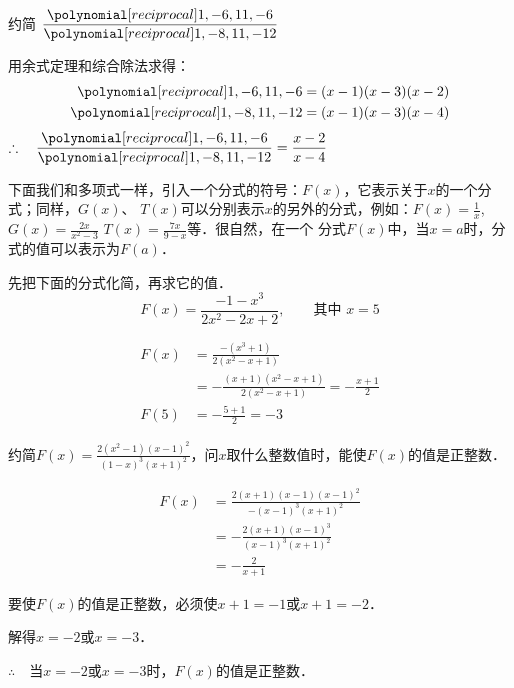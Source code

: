 \begin{example}
    约简 $\frac{\poly{1,-6,11,-6}}{\poly{1,-8,11,-12}}$  
\end{example}

\begin{solution}
用余式定理和综合除法求得：
\[\begin{split}
    \poly{1,-6,11,-6}&=(x-1)(x-3)(x-2)\\
    \poly{1,-8,11,-12}&=(x-1)(x-3)(x-4)
\end{split}\]
$\therefore\quad \frac{\poly{1,-6,11,-6}}{\poly{1,-8,11,-12}}=\frac{x-2}{x-4}$
\end{solution}

下面我们和多项式一样，引入一个分式的符号：$F(x)$，它表示关于$x$的一个分式；同样，$G(x)$、
$T(x)$可以分别表示$x$的另外的分式，例如：$F(x)=\frac{1}{x}$, $G(x)=\frac{2x}{x^2-3}$
$T (x) =\frac{7x}{9-x}$等．很自然，在一个
分式$F(x)$中，当$x=a$时，分式的值可以表示为$F (a)$．

\begin{example}
    先把下面的分式化简，再求它的值．
    \[F(x)=\frac{-1-x^3}{2x^2-2x+2},\qquad \text{其中 } x=5 \]
\end{example}
\begin{solution}
    \[\begin{split}
        F(x)&=\frac{-(x^3+1)}{2(x^2-x+1)}\\
&=-\frac{(x+1)(x^2-x+1)}{2(x^2-x+1)}=-\frac{x+1}{2}\\        
F(5)&=-\frac{5+1}{2}=-3
    \end{split}\]
\end{solution}

\begin{example}
    约简$F(x)=\frac{2(x^2-1)(x-1)^2}{(1-x)^3(x+1)^2}$，问$x$取什么整数值时，能使$F(x)$的值是正整数．
\end{example}

\begin{solution}
    \[\begin{split}
        F(x)&=\frac{2(x+1)(x-1)(x-1)^2}{-(x-1)^3 (x+1)^2}\\
        &=-\frac{2(x+1)(x-1)^3}{(x-1)^3(x+1)^2}\\
        &=-\frac{2}{x+1}
    \end{split}\]

    要使$F(x)$的值是正整数，必须使$x+1=-1$或$x+1=-2$．

    解得$x=-2$或$x=-3$．

    $\therefore\quad $当$x=-2$或$x=-3$时，$F(x)$的值是正整数．
\end{solution}

